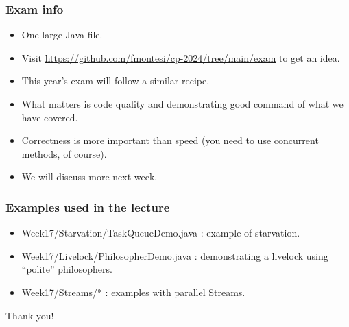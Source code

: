 \documentclass[xcolor={dvipsnames,svgnames},aspectratio=169]{beamer}
\begin{document}
\begin{frame}[fragile]
  \frametitle{Exam info}

  \begin{itemize}
  \item[\faBook]<1-> One large Java file.
  \item[\faBook]<1-> Visit
    \href{https://github.com/fmontesi/cp-2024/tree/main/exam}{https://github.com/fmontesi/cp-2024/tree/main/exam}
    to get an idea.
  \item[\faBook]<1-> This year's exam will follow a similar recipe.
  \item[\faBook]<1-> What matters is code quality and demonstrating good
    command of what we have covered.
  \item[\faBook]<1-> Correctness is more important than speed (you need to use
    concurrent methods, of course).
  \item[\faBook]<1-> We will discuss more next week.
  \end{itemize}

\end{frame}

\begin{frame}[fragile]
  \frametitle{Examples  used in the lecture}

  \begin{itemize}
  \item[\faCode]<1-> Week17/Starvation/TaskQueueDemo.java : example of
    starvation.
  \item[\faCode]<1-> Week17/Livelock/PhilosopherDemo.java : demonstrating a
    livelock using ``polite'' philosophers.
  \item[\faCode]<1-> Week17/Streams/* : examples with parallel Streams.
  \end{itemize}

\end{frame}

\begin{frame}{}
  \centering \huge
  Thank you!
\end{frame}
\end{document}

